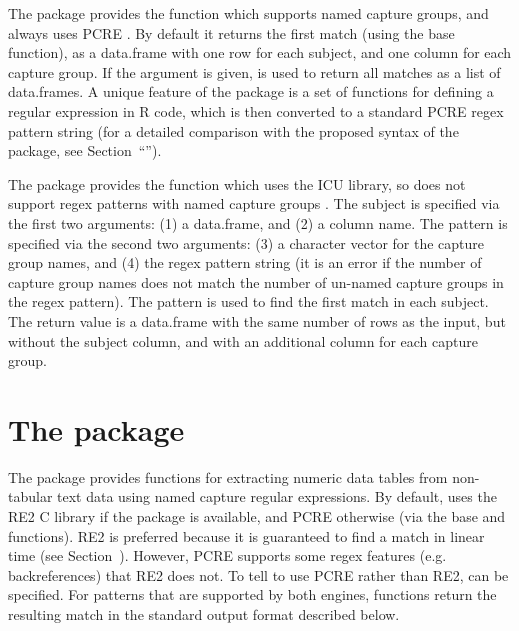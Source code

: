 The  package provides the  function which supports
named capture groups, and always uses PCRE \citep{rex}. By default it
returns the first match (using the base  function), as a
data.frame with one row for each subject, and one column for each
capture group. If the  argument is given,
 is used to return all matches as a list of
data.frames. A unique feature of the  package is a set of functions
for defining a regular expression in R code, which is then converted
to a standard PCRE regex pattern string (for a detailed comparison
with the proposed syntax of the  package, see
Section~``\sectionrex'').

The  package provides the  function which uses the
ICU library, so does not support regex patterns with named capture
groups \citep{tidyr}. The subject is specified via the first two
arguments: (1) a data.frame, and (2) a column name. The pattern is
specified via the second two arguments: (3) a character vector for the
capture group names, and (4) the regex pattern string (it is an error
if the number of capture group names does not match the number of un-named
capture groups in the regex pattern). The pattern is used to find the
first match in each subject. The return value is a data.frame with the
same number of rows as the input, but without the subject column, and
with an additional column for each capture group.


\section{The  package}

The  package provides functions for extracting
numeric data tables from non-tabular text data using named capture
regular expressions. By default,  uses the RE2 C
library if the  package is available, and PCRE otherwise
(via the base  and  functions). RE2 is
preferred because it is guaranteed to find a match in linear time (see
Section~\sectiontimings). However, PCRE supports some regex features
(e.g. backreferences) that RE2 does not. To tell
 to use PCRE rather than RE2,
 can be specified. For
patterns that are supported by both engines, 
functions return the resulting match in the standard output format
described below.

